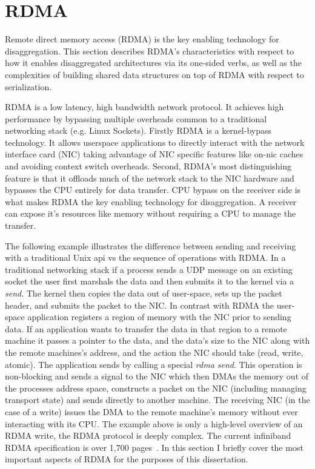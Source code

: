 \documentclass[12pt]{ucsddissertation}
\begin{document}
\section{RDMA}

Remote direct memory access (RDMA) is the key enabling technology for disaggregation. This section
describes RDMA's characteristics with respect to how it enables disaggregated architectures via its
one-sided verbs, as well as the complexities of building shared data structures on top of RDMA with
respect to serialization.

RDMA is a low latency, high bandwidth network protocol. It achieves high performance by bypassing
multiple overheads common to a traditional networking stack (e.g.  Linux Sockets). 
Firstly RDMA is a kernel-bypass technology. It allows userspace applications to directly interact
with the network interface card (NIC) taking advantage of NIC specific features like on-nic
caches~\cite{sherman} and avoiding context switch overheads.
Second, RDMA's most distinguishing feature is that it offloads much of the network stack to the NIC
hardware and bypasses the CPU entirely for data transfer. CPU bypass on the receiver side is what
makes RDMA the key enabling technology for disaggregation. A receiver can expose it's resources like
memory without requiring a CPU to manage the transfer.

The following example illustrates the difference between sending and receiving with a traditional
Unix api vs the sequence of operations with RDMA. In a traditional networking stack if a process
sends a UDP message on an existing socket the user first marshals the data and then submits it to
the kernel via a \textit{send}. The kernel then copies the data out of user-space, sets up the
packet header, and submits the packet to the NIC. 
In contrast with RDMA the user-space application
registers a region of memory with the NIC prior to sending data. If an application wants to transfer
the data in that region to a remote machine it passes a pointer to the data, and the data's size to
the NIC along with the remote machines's address, and the action the NIC should take (read, write,
atomic). The application sends by calling a special \textit{rdma send}. This operation is
non-blocking and sends a signal to the NIC which then DMAs the memory out of the processes address
space, constructs a packet on the NIC (including managing transport state) and sends directly to
another machine. The receiving NIC (in the case of a write) issues the DMA to the remote machine's
memory without ever interacting with its CPU.  
 The example above is only a high-level overview of an RDMA write,
the RDMA protocol is deeply complex. The current infiniband RDMA specification is over 1,700
pages~\cite{infiniband-spec}. In this section I briefly cover the most important aspects of RDMA for
the purposes of this dissertation.
\end{document}
